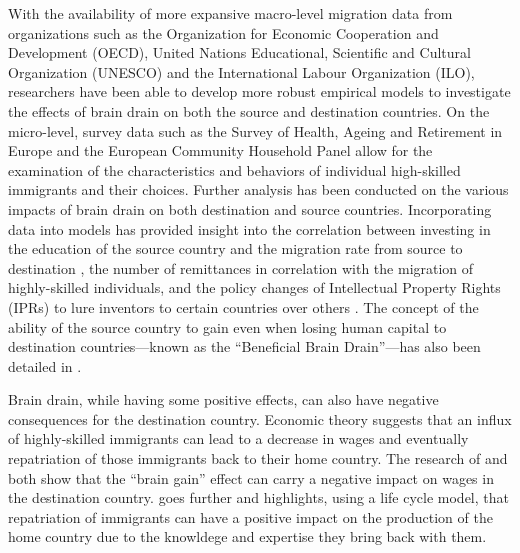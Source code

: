 \documentclass[12pt]{article}
\begin{document}
With the availability of more expansive macro-level migration data from organizations such as the Organization for Economic Cooperation and Development (OECD), United Nations Educational, Scientific and Cultural Organization (UNESCO) and the International Labour Organization (ILO), researchers have been able to develop more robust empirical models to investigate the effects of brain drain on both the source and destination countries.
On the micro-level, survey data such as the Survey of Health, Ageing and Retirement in Europe and the European Community Household Panel allow for the examination of the characteristics and behaviors of individual high-skilled immigrants and their choices.
Further analysis has been conducted on the various impacts of brain drain on both destination and source countries.
Incorporating data into models has provided insight into the correlation between investing in the education of the source country and the migration rate from source to destination \autocite{beine_brain_2001}, the number of remittances in correlation with the migration of highly-skilled individuals, and the policy changes of Intellectual Property Rights (IPRs) to lure inventors to certain countries over others \autocite{mcausland_bidding_2011}.
The concept of the ability of the source country to gain even when losing human capital to destination countries—known as the ``Beneficial Brain Drain''—has also been detailed in \cite{kuhn_international_2006}.

Brain drain, while having some positive effects, can also have negative consequences for the destination country.
Economic theory suggests that an influx of highly-skilled immigrants can lead to a decrease in wages and eventually repatriation of those immigrants back to their home country.
The research of \cite{chiswick_high_2005} and \cite{hussain_reversing_2015} both show that the ``brain gain'' effect can carry a negative impact on wages in the destination country.
\cite{hussain_reversing_2015} goes further and highlights, using a life cycle model, that repatriation of immigrants can have a positive impact on the production of the home country due to the knowldege and expertise they bring back with them. 
\end{document}
